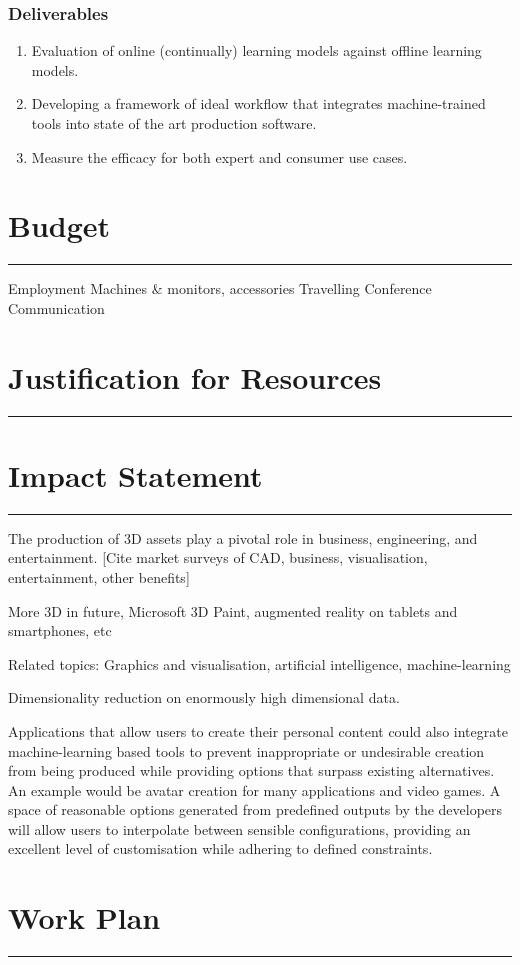 \documentclass[a4paper, fontsize=15pt, onecolumn]{article} %
\numberwithin{equation}{section} %
\numberwithin{figure}{section} %
\numberwithin{table}{section} %
\begin{document}
\subsubsection{Deliverables}
\begin{enumerate}
	\item Evaluation of online (continually) learning models against offline learning models.
	\item Developing a framework of ideal workflow that integrates machine-trained tools into state of the art production software.
	\item Measure the efficacy for both expert and consumer use cases.
\end{enumerate}
	


\newpage

\section*{Budget}
\hrule
Employment
Machines \& monitors, accessories
Travelling
Conference
Communication

\newpage

\section*{Justification for Resources}
\hrule
\newpage

\section*{Impact Statement}
\hrule
The production of 3D assets play a pivotal role in business, engineering, and entertainment.
[Cite market surveys of CAD, business, visualisation, entertainment, other benefits]

More 3D in future, Microsoft 3D Paint, augmented reality on tablets and smartphones, etc

Related topics: Graphics and visualisation, artificial intelligence, machine-learning

Dimensionality reduction on enormously high dimensional data.

Applications that allow users to create their personal content could also integrate machine-learning based tools to prevent inappropriate or undesirable creation from being produced while providing options that surpass existing alternatives. An example would be avatar creation for many applications and video games. A space of reasonable options generated from predefined outputs by the developers will allow users to interpolate between sensible configurations, providing an excellent level of customisation while adhering to defined constraints.


\newpage

\section*{Work Plan}
\hrule
\end{document}
